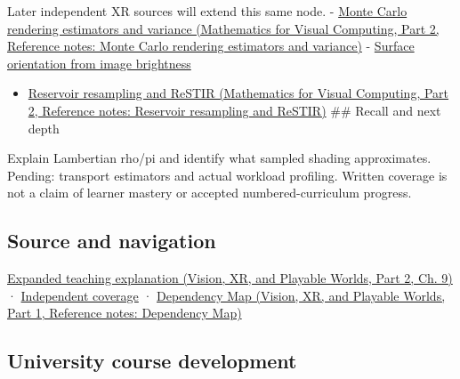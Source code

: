 Later independent XR sources will extend this same node. - \href{../02-Mathematics-for-Visual-Computing-P02/main.pdf\#appendix-031e02bf28af}{Monte Carlo rendering estimators and variance (Mathematics for Visual Computing, Part 2, Reference notes: Monte Carlo rendering estimators and variance)} - \hyperref[appendix-89b2d5b7c9e1]{Surface orientation from image brightness}

\begin{itemize}
\tightlist
\item
  \href{../02-Mathematics-for-Visual-Computing-P02/main.pdf\#appendix-68be451b78b1}{Reservoir resampling and ReSTIR (Mathematics for Visual Computing, Part 2, Reference notes: Reservoir resampling and ReSTIR)} \#\# Recall and next depth
\end{itemize}

Explain Lambertian rho/pi and identify what sampled shading approximates. Pending: transport estimators and actual workload profiling. Written coverage is not a claim of learner mastery or accepted numbered-curriculum progress.

\subsection{Source and navigation}\label{appendix-96da0b153b77-source-and-navigation}

\hypertarget{appendix-96da0b153b77-source-and-navigation}{}

\href{../07-Vision-XR-and-Playable-Worlds-P02/main.pdf\#04-visual-computing-ii-ch042-materials-turn-incoming-light-into-outgoing-light}{Expanded teaching explanation (Vision, XR, and Playable Worlds, Part 2, Ch. 9)} · \hyperref[appendix-fd090d982a15-xr01---independent-seeing-and-representation-source]{Independent coverage} · \href{../07-Vision-XR-and-Playable-Worlds-P01/main.pdf\#appendix-4ad47bdd269a}{Dependency Map (Vision, XR, and Playable Worlds, Part 1, Reference notes: Dependency Map)}

\subsection{University course development}\label{appendix-96da0b153b77-university-course-development}

\hypertarget{appendix-96da0b153b77-university-course-development}{}

